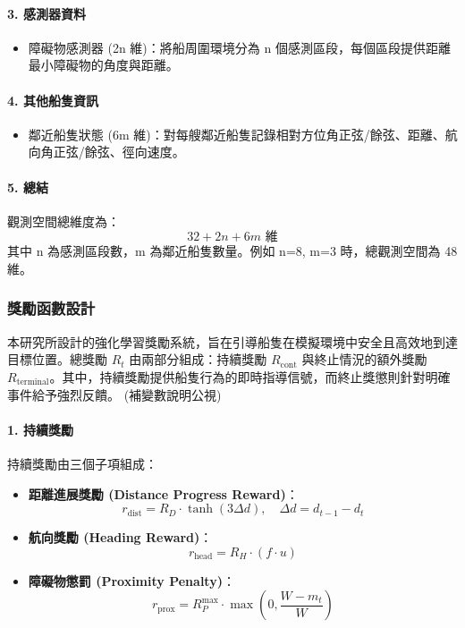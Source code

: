 \documentclass[12pt,a4paper]{article}
\begin{document}
\paragraph{3. 感測器資料}
\begin{itemize}
    \item 障礙物感測器 (2n 維)：將船周圍環境分為 n 個感測區段，每個區段提供距離最小障礙物的角度與距離。
\end{itemize}

\paragraph{4. 其他船隻資訊}
\begin{itemize}
    \item 鄰近船隻狀態 (6m 維)：對每艘鄰近船隻記錄相對方位角正弦/餘弦、距離、航向角正弦/餘弦、徑向速度。
\end{itemize}

\paragraph{5. 總結}
觀測空間總維度為：
\[
32 + 2n + 6m \text{ 維}
\]
其中 n 為感測區段數，m 為鄰近船隻數量。例如 n=8, m=3 時，總觀測空間為 48 維。

\subsubsection{獎勵函數設計}

本研究所設計的強化學習獎勵系統，旨在引導船隻在模擬環境中安全且高效地到達目標位置。總獎勵 $R_t$ 由兩部分組成：持續獎勵 $R_{\text{cont}}$ 與終止情況的額外獎勵 $R_{\text{terminal}}$。其中，持續獎勵提供船隻行為的即時指導信號，而終止獎懲則針對明確事件給予強烈反饋。
(補變數說明公視)
\paragraph{1. 持續獎勵}
持續獎勵由三個子項組成：
\begin{itemize}
    \item \textbf{距離進展獎勵 (Distance Progress Reward)}：
    \[
    r_{\text{dist}} = R_D \cdot \tanh(3 \Delta d), \quad \Delta d = d_{t-1}-d_t
    \]
    \item \textbf{航向獎勵 (Heading Reward)}：
    \[
    r_{\text{head}} = R_H \cdot (f \cdot u)
    \]
    \item \textbf{障礙物懲罰 (Proximity Penalty)}：
    \[
    r_{\text{prox}} = R_P^{\max} \cdot \max\!\left(0, \frac{W - m_t}{W}\right)
    \]
\end{itemize}
\end{document}
